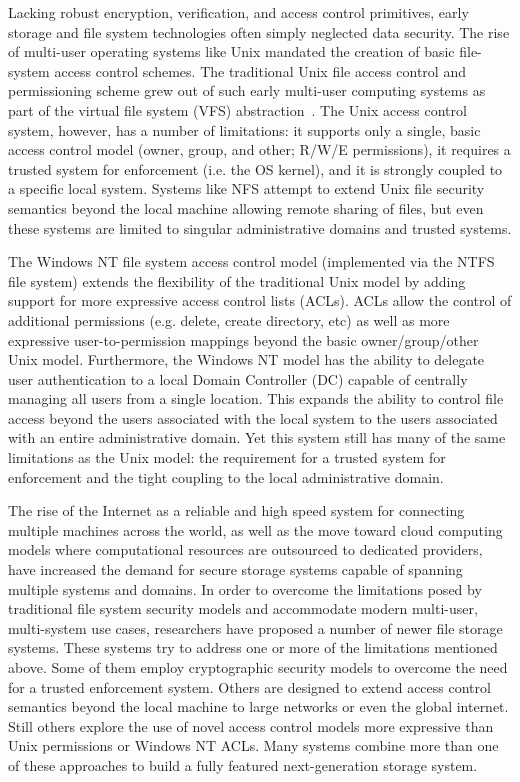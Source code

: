 Lacking robust encryption, verification, and access control
primitives, early storage and file system technologies often simply
neglected data security. The rise of multi-user operating systems like
Unix mandated the creation of basic file-system access control
schemes. The traditional Unix file access control and permissioning
scheme grew out of such early multi-user computing systems as part of
the virtual file system (VFS) abstraction~\cite{linux-vfs}. The Unix
access control system, however, has a number of limitations: it
supports only a single, basic access control model (owner, group, and
other; R/W/E permissions), it requires a trusted system for
enforcement (i.e. the OS kernel), and it is strongly coupled to a
specific local system. Systems like NFS attempt to extend Unix file
security semantics beyond the local machine allowing remote sharing of
files, but even these systems are limited to singular administrative
domains and trusted systems.

The Windows NT file system access control model (implemented via the
NTFS file system) extends the flexibility of the traditional Unix
model by adding support for more expressive access control lists
(ACLs). ACLs allow the control of additional permissions (e.g. delete,
create directory, etc) as well as more expressive user-to-permission
mappings beyond the basic owner/group/other Unix model. Furthermore,
the Windows NT model has the ability to delegate user authentication
to a local Domain Controller (DC) capable of centrally managing all
users from a single location. This expands the ability to control file
access beyond the users associated with the local system to the users
associated with an entire administrative domain. Yet this system still
has many of the same limitations as the Unix model: the requirement
for a trusted system for enforcement and the tight coupling to the
local administrative domain.

The rise of the Internet as a reliable and high speed system for
connecting multiple machines across the world, as well as the move
toward cloud computing models where computational resources are
outsourced to dedicated providers, have increased the demand for
secure storage systems capable of spanning multiple systems and
domains. In order to overcome the limitations posed by traditional
file system security models and accommodate modern multi-user,
multi-system use cases, researchers have proposed a number of newer
file storage systems. These systems try to address one or more of the
limitations mentioned above. Some of them employ cryptographic
security models to overcome the need for a trusted enforcement
system. Others are designed to extend access control semantics beyond
the local machine to large networks or even the global internet. Still
others explore the use of novel access control models more expressive
than Unix permissions or Windows NT ACLs. Many systems combine more
than one of these approaches to build a fully featured next-generation
storage system.

